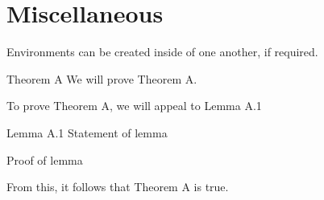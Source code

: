\documentclass[a4paper,12pt]{article}
\begin{document}
\section{Miscellaneous}
Environments can be created inside of one another, if required.
\begin{theorem}{Theorem A}{}
    We will prove Theorem A. 
\end{theorem}
\begin{tproof*}
    To prove Theorem A, we will appeal to Lemma A.1
    \begin{lemma}{Lemma A.1}{}
        Statement of lemma
    \end{lemma}
    \begin{lproof*}{}{}
        Proof of lemma
    \end{lproof*}
    From this, it follows that Theorem A is true.
\end{tproof*}
\end{document}
